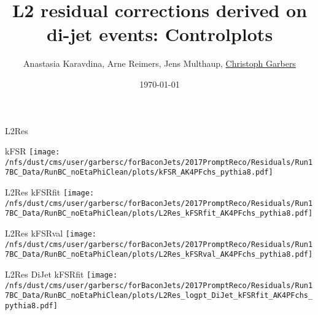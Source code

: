 \documentclass[t,compress]{beamer}
\title[L2 residual corrections]{L2 residual corrections derived on di-jet events: Controlplots}
\author[Christoph Garbers]{Anastasia Karavdina, Arne Reimers, Jens Multhaup, \underline{Christoph Garbers}}
\institute[UHH]{University of Hamburg}
\date{\today}
\begin{document}
\begin{frame}
 \titlepage
\end{frame}

\begin{frame}{L2Res}
\begin{minipage}{0.24\textwidth}
\tiny  kFSR    
 \newline
	\texttt{[image: /nfs/dust/cms/user/garbersc/forBaconJets/2017PromptReco/Residuals/Run17BC\_Data/RunBC\_noEtaPhiClean/plots/kFSR\_AK4PFchs\_pythia8.pdf]}
\end{minipage}
\begin{minipage}{0.24\textwidth}
\tiny  L2Res kFSRfit    
 \newline
	\texttt{[image: /nfs/dust/cms/user/garbersc/forBaconJets/2017PromptReco/Residuals/Run17BC\_Data/RunBC\_noEtaPhiClean/plots/L2Res\_kFSRfit\_AK4PFchs\_pythia8.pdf]}
\end{minipage}
\begin{minipage}{0.24\textwidth}
\tiny  L2Res kFSRval    
 \newline
	\texttt{[image: /nfs/dust/cms/user/garbersc/forBaconJets/2017PromptReco/Residuals/Run17BC\_Data/RunBC\_noEtaPhiClean/plots/L2Res\_kFSRval\_AK4PFchs\_pythia8.pdf]}
\end{minipage}
\begin{minipage}{0.24\textwidth}
\tiny  L2Res   DiJet kFSRfit    
 \newline
	\texttt{[image: /nfs/dust/cms/user/garbersc/forBaconJets/2017PromptReco/Residuals/Run17BC\_Data/RunBC\_noEtaPhiClean/plots/L2Res\_logpt\_DiJet\_kFSRfit\_AK4PFchs\_pythia8.pdf]}
\end{minipage}
\newline


\end{frame}
\end{document}
